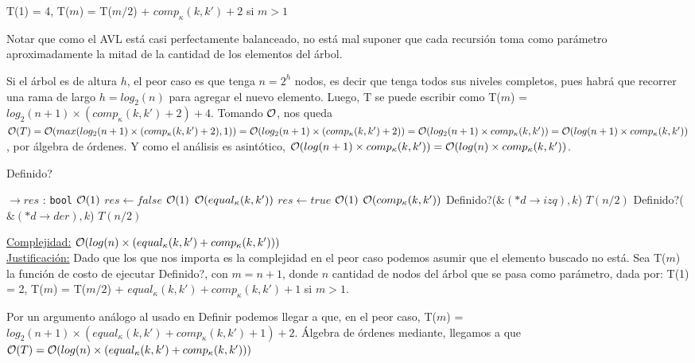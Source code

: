 \begin{Algoritmos}
\begin{algorithm}
T(1) = 4, T($m$) = T($m/2$) + $comp_{\kappa}(k, k') + 2$ si $m > 1$

Notar que como el AVL está casi perfectamente balanceado, no está mal suponer que cada recursión toma como parámetro aproximadamente la mitad de la cantidad de los elementos del árbol.

Si el árbol es de altura $h$, el peor caso es que tenga $n = 2^{h}$ nodos, es decir que tenga todos sus niveles completos, pues habrá que recorrer una rama de largo $h = log_2(n)$ para agregar el nuevo elemento. Luego, T se puede escribir como T($m$) = $log_2(n + 1) \times (comp_{\kappa}(k, k') + 2) + 4$. Tomando $\mathcal{O}$, nos queda $\mathcal{O}(T) = \mathcal{O}(max(log_2(n + 1) \times (comp_{\kappa}(k, k') + 2), 1)) = \mathcal{O}(log_2(n + 1) \times (comp_{\kappa}(k, k') + 2)) = \mathcal{O}(log_2(n + 1) \times comp_{\kappa}(k, k')) = \mathcal{O}(log(n + 1) \times comp_{\kappa}(k, k'))$, por álgebra de órdenes. Y como el análisis es asintótico, $\mathcal{O}(log(n + 1) \times comp_{\kappa}(k, k')) = \mathcal{O}(log(n) \times comp_{\kappa}(k, k'))$.

\end{algorithm}

\begin{algorithm}
\caption{Definido?}
\begin{algorithmic}[1]
$\to res$ : \texttt{bool}
	\Comment $\mathcal{O}(1)$
	 \State $res\gets false$
	 \Comment $\mathcal{O}(1)$
	 \Else	
		\Comment $\mathcal{O}(equal_{\kappa}(k, k'))$
			\State $res\gets true$
			\Comment $\mathcal{O}(1)$
		\Else
			\Comment $\mathcal{O}(comp_{\kappa}(k, k'))$
				\State Definido?($\&(*d\to izq), k$)	
				\Comment $T(n/2)$	
			\Else
				\State Definido?($\&(*d\to der), k$)
				\Comment $T(n/2)$
			\EndIf
		\EndIf
	\EndIf
\EndProcedure
\end{algorithmic}
\underline{Complejidad:} $\mathcal{O}(log(n) \times (equal_{\kappa}(k, k') +comp_{\kappa}(k, k')))$ \\
\underline{Justificación:} Dado que los que nos importa es la complejidad en el peor caso podemos asumir que el elemento buscado no está. Sea T($m$) la función de costo de ejecutar Definido?, con $m = n + 1$, donde $n$ cantidad de nodos del árbol que se pasa como parámetro, dada por: T(1) = 2, T($m$) = T($m/2$) + $equal_{\kappa}(k, k') + comp_{\kappa}(k, k') + 1$ si $m > 1$.

Por un argumento análogo al usado en Definir podemos llegar a que, en el peor caso, T($m$) = $log_2(n + 1) \times (equal_{\kappa}(k, k') + comp_{\kappa}(k, k') + 1) + 2$. Álgebra de órdenes mediante, llegamos a que $\mathcal{O}(T) = \mathcal{O}(log(n) \times (equal_{\kappa}(k, k') + comp_{\kappa}(k, k')))$
\end{algorithm}


\end{Algoritmos}
